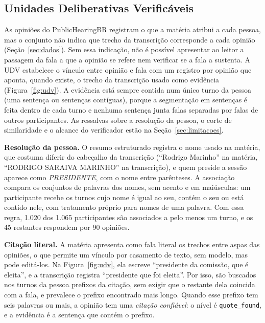 \subsection{Unidades Deliberativas Verificáveis}
\label{sec:metodo-udv}

As opiniões do PublicHearingBR registram o que a matéria atribui a cada pessoa, mas o conjunto não
indica que trecho da transcrição corresponde a cada opinião (Seção~\ref{sec:dados}). Sem essa
indicação, não é possível apresentar ao leitor a passagem da fala a que a opinião se refere nem
verificar se a fala a sustenta. A UDV estabelece o vínculo entre opinião e fala com um registro por
opinião que aponta, quando existe, o trecho da transcrição usado como evidência
(Figura~\ref{fig:udv}). A evidência está sempre contida num único turno da pessoa (uma sentença ou
sentenças contíguas), porque a segmentação em sentenças é feita dentro de cada turno e nenhuma
sentença junta falas separadas por falas de outros participantes. As ressalvas sobre a resolução da
pessoa, o corte de similaridade e o alcance do verificador estão na Seção~\ref{sec:limitacoes}.

\textbf{Resolução da pessoa.} O resumo estruturado registra o nome usado na matéria, que costuma
diferir do cabeçalho da transcrição (``Rodrigo Marinho'' na matéria, ``RODRIGO SARAIVA MARINHO'' na
transcrição), e quem preside a sessão aparece como \textit{PRESIDENTE}, com o nome entre parênteses.
A associação compara os conjuntos de palavras dos nomes, sem acento e em maiúsculas: um participante
recebe os turnos cujo nome é igual ao seu, contém o seu ou está contido nele, com tratamento próprio
para nomes de uma palavra. Com essa regra, 1.020 dos 1.065 participantes são associados a pelo menos
um turno, e os 45 restantes respondem por 90 opiniões.



\textbf{Citação literal.} A matéria apresenta como fala literal os trechos entre aspas das opiniões,
o que permite um vínculo por casamento de texto, sem modelo, mas pode editá-los. Na
Figura~\ref{fig:udv}, ela escreve ``presidente da comissão, que é eleita'', e a transcrição registra
``presidente que foi eleita''. Por isso, são buscados nos turnos da pessoa prefixos da citação, sem
exigir que o restante dela coincida com a fala, e prevalece o prefixo encontrado mais longo. Quando
esse prefixo tem seis palavras ou mais, a opinião tem uma \emph{citação confiável}: o nível é
\texttt{quote\_found}, e a evidência é a sentença que contém o prefixo.

